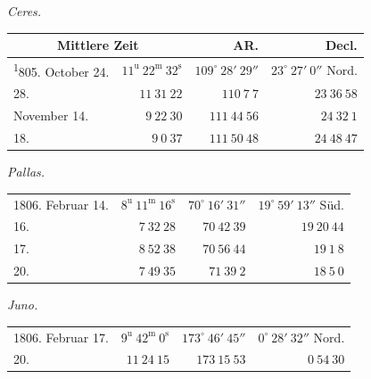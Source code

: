 \begin{center}\emph{Ceres.}\end{center}
\begin{center}
\begingroup\fontsize{9}{11}\selectfont\setlength{\tabcolsep}{2pt}\renewcommand{\arraystretch}{1.1}
\begin{tabular}{lr|r|r}
\multicolumn{2}{c|}{Mittlere Zeit} & AR. & Decl.\\ \hline
\textsuperscript{1}805. October 24. & $11^{\mathrm u}\ 22^{\mathrm m}\ 32^{\mathrm s}$ & $109^\circ\ 28'\ 29''$ & $23^\circ\ 27'\ 0''$ Nord.\\
28. & $11\ 31\ 22$ & $110\ 7\ 7$ & $23\ 36\ 58$\\
November 14. & $9\ 22\ 30$ & $111\ 44\ 56$ & $24\ 32\ 1$\\
18. & $9\ 0\ 37$ & $111\ 50\ 48$ & $24\ 48\ 47$\\
\end{tabular}\endgroup
\end{center}

\begin{center}\emph{Pallas.}\end{center}
\begin{center}
\begingroup\fontsize{9}{11}\selectfont\setlength{\tabcolsep}{2pt}\renewcommand{\arraystretch}{1.1}
\begin{tabular}{lr|r|r}
1806. Februar 14. & $8^{\mathrm u}\ 11^{\mathrm m}\ 16^{\mathrm s}$ & $70^\circ\ 16'\ 31''$ & $19^\circ\ 59'\ 13''$ Süd.\\
16. & $7\ 32\ 28$ & $70\ 42\ 39$ & $19\ 20\ 44$\\
17. & $8\ 52\ 38$ & $70\ 56\ 44$ & $19\ 1\ 8$\\
20. & $7\ 49\ 35$ & $71\ 39\ 2$ & $18\ 5\ 0$\\
\end{tabular}\endgroup
\end{center}

\begin{center}\emph{Juno.}\end{center}
\begin{center}
\begingroup\fontsize{9}{11}\selectfont\setlength{\tabcolsep}{2pt}\renewcommand{\arraystretch}{1.1}
\begin{tabular}{lr|r|r}
1806. Februar 17. & $9^{\mathrm u}\ 42^{\mathrm m}\ 0^{\mathrm s}$ & $173^\circ\ 46'\ 45''$ & $0^\circ\ 28'\ 32''$ Nord.\\
20. & $11\ 24\ 15$ & $173\ 15\ 53$ & $0\ 54\ 30$\\
\end{tabular}\endgroup
\end{center}

